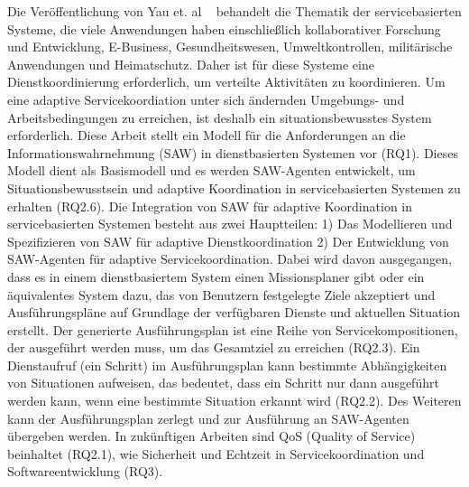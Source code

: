 \documentclass[conference,compsoc]{IEEEtran}
\begin{document}
Die Veröffentlichung von Yau et. al ~ \cite{huang2005situationaware} behandelt die Thematik der servicebasierten Systeme, die viele Anwendungen haben einschließlich kollaborativer Forschung und Entwicklung, E-Business, Gesundheitswesen, Umweltkontrollen, militärische Anwendungen und Heimatschutz. Daher ist für diese Systeme eine Dienstkoordinierung erforderlich, um verteilte Aktivitäten zu koordinieren. Um eine adaptive Servicekoordiation unter sich ändernden Umgebungs- und Arbeitsbedingungen zu erreichen, ist deshalb ein situationsbewusstes System erforderlich. Diese Arbeit stellt ein Modell für die Anforderungen an die Informationswahrnehmung (SAW) in dienstbasierten Systemen vor (RQ1). Dieses Modell dient als Basismodell und es werden SAW-Agenten entwickelt, um Situationsbewusstsein  und adaptive Koordination in servicebasierten Systemen zu erhalten (RQ2.6). Die Integration von SAW für adaptive Koordination in servicebasierten Systemen besteht aus zwei Hauptteilen: 1) Das Modellieren und Spezifizieren von SAW für adaptive Dienstkoordination 2) Der Entwicklung von SAW-Agenten für adaptive Servicekoordination. Dabei wird davon ausgegangen, dass es in einem dienstbasiertem System einen Missionsplaner gibt oder ein äquivalentes System dazu, das von Benutzern festgelegte Ziele akzeptiert und Ausführungspläne auf Grundlage der verfügbaren Dienste und aktuellen Situation erstellt. Der generierte Ausführungsplan ist eine Reihe von Servicekompositionen, der ausgeführt werden muss, um das Gesamtziel zu erreichen (RQ2.3). Ein Dienstaufruf (ein Schritt)  im Ausführungsplan kann bestimmte Abhängigkeiten von Situationen aufweisen, das bedeutet, dass ein Schritt nur dann ausgeführt werden kann, wenn eine bestimmte Situation erkannt wird (RQ2.2). Des Weiteren kann der Ausführungsplan zerlegt und zur Ausführung an SAW-Agenten übergeben werden. In zukünftigen Arbeiten sind QoS (Quality of Service) beinhaltet (RQ2.1), wie Sicherheit und Echtzeit in Servicekoordination und Softwareentwicklung (RQ3).  
\end{document}
